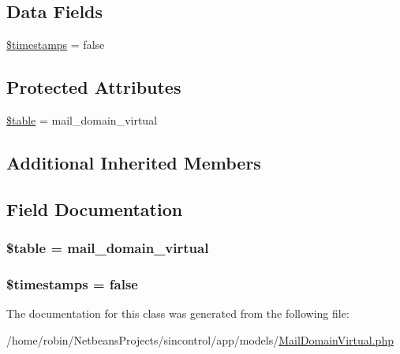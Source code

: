 \subsection*{Data Fields}
\begin{DoxyCompactItemize}
\item 
\hyperlink{class_mail_domain_virtual_a51267c24c8fae742ed8f9be0ba6085ee}{\$timestamps} = false
\end{DoxyCompactItemize}
\subsection*{Protected Attributes}
\begin{DoxyCompactItemize}
\item 
\hyperlink{class_mail_domain_virtual_ae8876a14058f368335baccf35af4a22b}{\$table} = \textquotesingle{}mail\+\_\+domain\+\_\+virtual\textquotesingle{}
\end{DoxyCompactItemize}
\subsection*{Additional Inherited Members}


\subsection{Field Documentation}
\hypertarget{class_mail_domain_virtual_ae8876a14058f368335baccf35af4a22b}{}
\subsubsection[{\$table}]{\setlength{\rightskip}{0pt plus 5cm}\$table = \textquotesingle{}mail\+\_\+domain\+\_\+virtual\textquotesingle{}\hspace{0.3cm}{\ttfamily [protected]}}\label{class_mail_domain_virtual_ae8876a14058f368335baccf35af4a22b}
\hypertarget{class_mail_domain_virtual_a51267c24c8fae742ed8f9be0ba6085ee}{}
\subsubsection[{\$timestamps}]{\setlength{\rightskip}{0pt plus 5cm}\$timestamps = false}\label{class_mail_domain_virtual_a51267c24c8fae742ed8f9be0ba6085ee}


The documentation for this class was generated from the following file\+:\begin{DoxyCompactItemize}
\item 
/home/robin/\+Netbeans\+Projects/sincontrol/app/models/\hyperlink{_mail_domain_virtual_8php}{Mail\+Domain\+Virtual.\+php}\end{DoxyCompactItemize}
